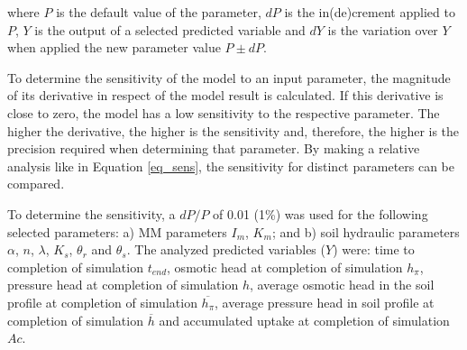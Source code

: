 \noindent
where $P$ is the default value of the parameter, $dP$ is the in(de)crement applied to $P$, $Y$ is the output of a selected predicted variable and $dY$ is the variation over $Y$ when applied the new parameter value $P \pm dP$.

To determine the sensitivity of the model to an input parameter, the magnitude of its derivative in respect of the model result is calculated. 
If this derivative is close to zero, the model has a low sensitivity to the respective parameter. 
The higher the derivative, the higher is the sensitivity and, therefore, the higher is the precision required when determining that parameter. 
By making a relative analysis like in Equation \ref{eq_sens}, the sensitivity for distinct parameters can be compared. 

To determine the sensitivity, a $dP/P$ of 0.01 (1\%) was used for the following selected parameters: 
a) MM parameters $I_m$, $K_m$; and  
b) soil hydraulic parameters $\alpha$, $n$, $\lambda$, $K_s$, $\theta_r$ and $\theta_s$.
The analyzed predicted variables ($Y$) were: time to completion of simulation $t_{end}$, osmotic head at completion of simulation $h_{\pi}$, pressure head at completion of simulation $h$, average osmotic head in the soil profile at completion of simulation $\overline{h_{\pi}}$, average pressure head in soil profile at completion of simulation $\overline{h}$ and accumulated uptake at completion of simulation $Ac$.

